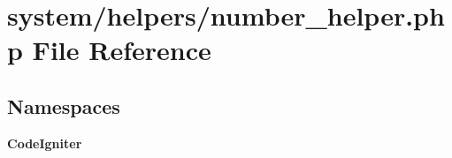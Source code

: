 \section{system/helpers/number\-\_\-helper.php File Reference}
\label{number__helper_8php}
\subsection*{Namespaces}
\begin{DoxyCompactItemize}
\item 
{\bf Code\-Igniter}
\end{DoxyCompactItemize}
